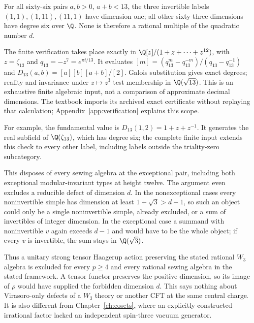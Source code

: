 \begin{constructioninput}
For all sixty-six pairs $a,b>0$, $a+b<13$, the three invertible
labels $(1,1),(1,11),(11,1)$ have dimension one; all other
sixty-three dimensions have degree six over $\Q$. None is therefore
a rational multiple of the quadratic number $d$.

The finite verification takes place exactly in
$\Q[z]/(1+z+\cdots+z^{12})$, with $z=\zeta_{13}$ and
$q_{13}=-z^7=e^{\pi i/13}$. It evaluates
$[m]=(q_{13}^m-q_{13}^{-m})/(q_{13}-q_{13}^{-1})$ and
$D_{13}(a,b)=[a][b][a+b]/[2]$. Galois substitution gives exact
degrees; reality and invariance under $z\mapsto z^3$ test membership
in $\Q(\sqrt{13})$. This is an exhaustive finite algebraic input,
not a comparison of approximate decimal dimensions.
The textbook imports its archived exact certificate without replaying
that calculation; Appendix~\ref{app:verification} explains this scope.
\end{constructioninput}

For example, the fundamental value is $D_{13}(1,2)=1+z+z^{-1}$.
It generates the real subfield of $\Q(\zeta_{13})$, which has degree
six; the complete finite input extends this check to every other label,
including labels outside the triality-zero subcategory.

This disposes of every sewing algebra at the exceptional pair,
including both exceptional modular-invariant types at height twelve.
The argument even excludes a reducible defect of dimension $d$.
In the nonexceptional cases every noninvertible simple has dimension
at least $1+\sqrt3>d-1$, so such an object could only be a single
noninvertible simple, already excluded, or a sum of invertibles of
integer dimension. In the exceptional case a summand with
noninvertible $v$ again exceeds $d-1$ and would have to be the whole
object; if every $v$ is invertible, the sum stays in $\Q(\sqrt3)$.

Thus a unitary strong tensor Haagerup action preserving the stated
rational $W_3$ algebra is excluded for every $p\geq4$ and every
rational sewing algebra in the stated framework. A tensor functor
preserves the positive dimension, so its image of $\rho$ would have
supplied the forbidden dimension $d$. This says nothing about
Virasoro-only defects of a $W_3$ theory or another CFT at the same
central charge. It is also different from Chapter~\ref{ch:cosets},
where an explicitly constructed irrational factor lacked an independent
spin-three vacuum generator.

